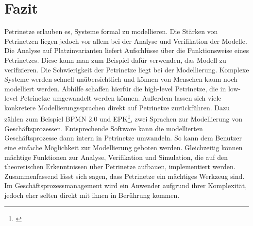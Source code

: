 \chapter{Fazit}
Petrinetze erlauben es, Systeme formal zu modellieren. Die Stärken von Petrinetzen liegen jedoch vor allem bei der Analyse und Verifikation der Modelle. Die Analyse auf Platzinvarianten liefert Aufschlüsse über die Funktionsweise eines Petrinetzes. Diese kann man zum Beispiel dafür verwenden, das Modell zu verifizieren.
Die Schwierigkeit der Petrinetze liegt bei der Modellierung.
Komplexe Systeme werden schnell unübersichtlich und können von Menschen kaum noch modelliert werden.
Abhilfe schaffen hierfür die high-level Petrinetze, die in low-level Petrinetze umgewandelt werden können. Außerdem lassen sich viele konkretere Modellierungssprachen direkt auf Petrinetze zurückführen. Dazu zählen zum Beispiel BPMN 2.0 und EPK\footnote{\cite{fernuni_hagen:diss}}, zwei Sprachen zur Modellierung von Geschäftsprozessen. Entsprechende Software kann die modellierten Geschäftsprozesse dann intern in Petrinetze umwandeln. So kann dem Benutzer eine einfache Möglichkeit zur Modellierung geboten werden. Gleichzeitig können mächtige Funktionen zur Analyse, Verifikation und Simulation, die auf den theoretischen Erkenntnissen über Petrinetze aufbauen, implementiert werden.
Zusammenfassend lässt sich sagen, dass Petrinetze ein mächtiges Werkzeug sind. Im Geschäftsprozessmanagement wird ein Anwender aufgrund ihrer Komplexität, jedoch eher selten direkt mit ihnen in Berührung kommen.